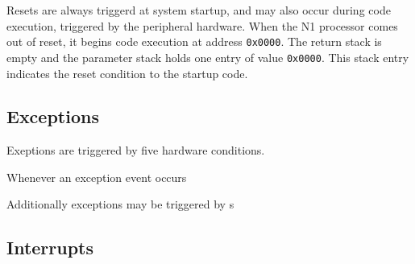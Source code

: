 Resets are always triggerd at system startup, and may also occur during code execution,
triggered by the peripheral hardware.
When the N1 processor comes out of reset, it begins code execution at address
\texttt{0x0000}. The return stack is empty and the parameter stack holds one entry
of value \texttt{0x0000}. This stack entry indicates the reset condition to the startup code. 

\subsection{Exceptions}
\label{reset:excpt}
Exeptions are triggered by five hardware conditions. 


Whenever an exception event occurs




Additionally exceptions may be triggered by s


\subsection{Interrupts}
\label{reset:irq}
